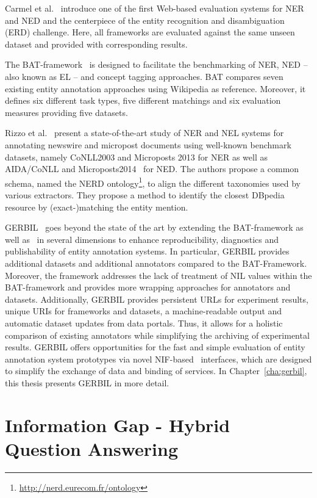 Carmel et al.~\cite{ERD2014} introduce one of the first Web-based evaluation systems for NER and NED and the centerpiece of the entity recognition and disambiguation (ERD) challenge. 
Here, all frameworks are evaluated against the same unseen dataset and provided with corresponding results. 

The BAT-framework~\cite{cornolti} is designed to facilitate the benchmarking of \ac{NER}, \ac{NED} -- also known as \ac{EL} -- and concept tagging approaches.
BAT compares seven existing entity annotation approaches using Wikipedia as reference.
Moreover, it defines six different task types, five different matchings and six evaluation measures providing five datasets.

Rizzo et al.~\cite{rizzo2014}  present a state-of-the-art study of NER and NEL systems for annotating newswire and micropost documents using well-known benchmark datasets, namely CoNLL2003 and Microposts 2013 for NER as well as AIDA/CoNLL and Microposts2014~\cite{Cano2014} for NED. 
The authors propose a common schema, named the NERD ontology\footnote{\url{http://nerd.eurecom.fr/ontology}}, to align the different taxonomies used by various extractors. They propose a method to identify the closest DBpedia resource by (exact-)matching the entity mention.

GERBIL~\cite{GERBIL} goes beyond the state of the art by extending the BAT-framework as well as~\cite{rizzo2014} in several dimensions to enhance reproducibility, diagnostics and publishability of entity annotation systems. 
In particular, GERBIL provides \numberOfadditionalDatasets additional datasets and \numberOfadditionalAnnotators additional annotators compared to the BAT-Framework. 
Moreover, the framework addresses the lack of treatment of NIL values within the BAT-framework and provides more wrapping approaches for annotators and datasets. 
Additionally, GERBIL provides persistent URLs for experiment results, unique URIs for frameworks and datasets, a machine-readable output and automatic dataset updates from data portals. 
Thus, it allows for a holistic comparison of existing annotators while simplifying the archiving of experimental results. 
GERBIL offers opportunities for the fast and simple evaluation of entity annotation system prototypes via novel NIF-based~\cite{NIF} interfaces, which are designed to simplify the exchange of data and binding of services.
In Chapter~\ref{cha:gerbil}, this thesis presents GERBIL in more detail.

\section{Information Gap - Hybrid Question Answering}

